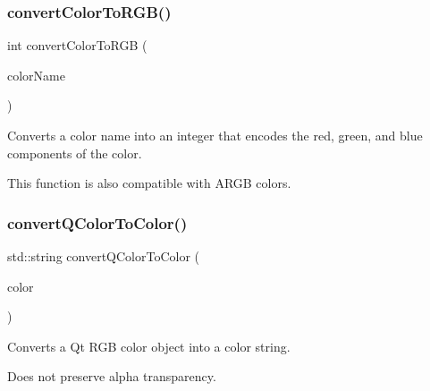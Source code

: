 \mbox{\label{classsgl_1_1GColor_aab4a1480d396f913220aea51d117eb94}} 
\subsubsection{\texorpdfstring{convert\+Color\+To\+R\+G\+B()}{convertColorToRGB()}}
{\footnotesize\ttfamily int convert\+Color\+To\+R\+GB (\begin{DoxyParamCaption}\item[{const std\+::string \&}]{color\+Name }\end{DoxyParamCaption})\hspace{0.3cm}{\ttfamily [static]}}



Converts a color name into an integer that encodes the red, green, and blue components of the color. 

This function is also compatible with A\+R\+GB colors. \mbox{\label{classsgl_1_1GColor_a2ad78585a77dad65eb23299714545f7c}} 
\subsubsection{\texorpdfstring{convert\+Q\+Color\+To\+Color()}{convertQColorToColor()}}
{\footnotesize\ttfamily std\+::string convert\+Q\+Color\+To\+Color (\begin{DoxyParamCaption}\item[{const Q\+Color \&}]{color }\end{DoxyParamCaption})\hspace{0.3cm}{\ttfamily [static]}}



Converts a Qt R\+GB color object into a color string. 

Does not preserve alpha transparency. \mbox{\label{classsgl_1_1GColor_a30f06933a10f00500d6b7991f8b61dde}} 
